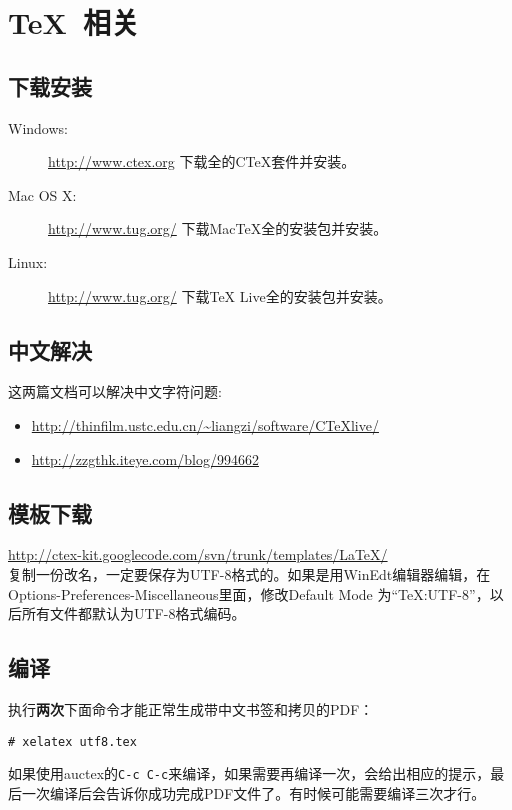\section{\TeX~相关}
\subsection{下载安装}
\begin{description}
\item[Windows:] \url{http://www.ctex.org} 下载全的CTeX套件并安装。
\item[Mac OS X:] \url{http://www.tug.org/} 下载MacTeX全的安装包并安装。
\item[Linux:] \url{http://www.tug.org/} 下载TeX Live全的安装包并安装。
\end{description}

\subsection{中文解决}
这两篇文档可以解决中文字符问题:
\begin{itemize}
\item \url{http://thinfilm.ustc.edu.cn/~liangzi/software/CTeXlive/}
\item \url{http://zzgthk.iteye.com/blog/994662}
\end{itemize}

\subsection{模板下载}
\url{http://ctex-kit.googlecode.com/svn/trunk/templates/LaTeX/}
\\
复制一份改名，一定要保存为UTF-8格式的。如果是用WinEdt编辑器编辑，在Options-\-Preferences-\-Miscellaneous里面，修改Default Mode 为``TeX:UTF-8''，以后所有文件都默认为UTF-8格式编码。
\\
\subsection{编译}
执行\textbf{两次}下面命令才能正常生成带中文书签和拷贝的PDF：
\begin{lstlisting}[numbers=none]
# xelatex utf8.tex
\end{lstlisting}

如果使用auctex的\verb|C-c C-c|来编译，如果需要再编译一次，会给出相应的提示，最后一次编译后会告诉你成功完成PDF文件了。有时候可能需要编译三次才行。

